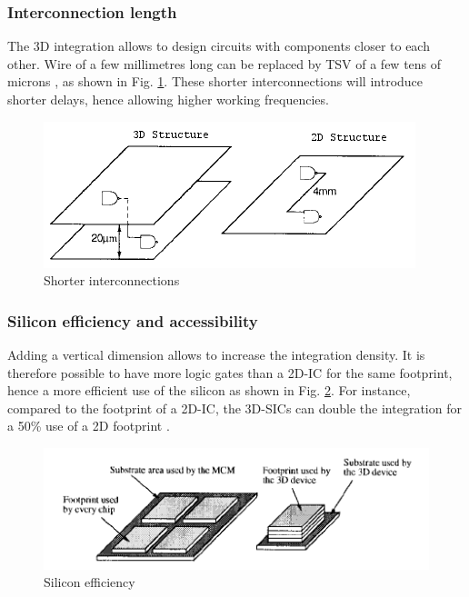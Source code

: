 \subsubsection*{Interconnection length}

The 3D integration allows to design circuits with components closer to each other. Wire of a few millimetres long can be replaced by TSV of a few tens of microns \cite{659500}, as shown in Fig. \ref{fig:wire}. These shorter interconnections will introduce shorter delays, hence allowing higher working frequencies.

\begin{figure}[h!]
\begin{center}
\includegraphics[width=0.75\linewidth]{wire.png}
\end{center}
\vspace{-0.5cm}
\caption{Shorter interconnections}
\label{fig:wire}
\end{figure}

\subsubsection*{Silicon efficiency and accessibility}

Adding a vertical dimension allows to increase the integration density. It is therefore possible to have more logic gates than a 2D-IC for the same footprint, hence a more efficient use of the silicon as shown in Fig. \ref{fig:footprint}. For instance, compared to the footprint of a 2D-IC, the 3D-SICs can double the integration for a 50\% use of a 2D footprint \cite{659500}.

\begin{figure}[h!]
\begin{center}
\includegraphics[width=0.75\linewidth]{footprint.png}
\end{center}
\vspace{-0.5cm}
\caption{Silicon efficiency}
\label{fig:footprint}
\end{figure}

